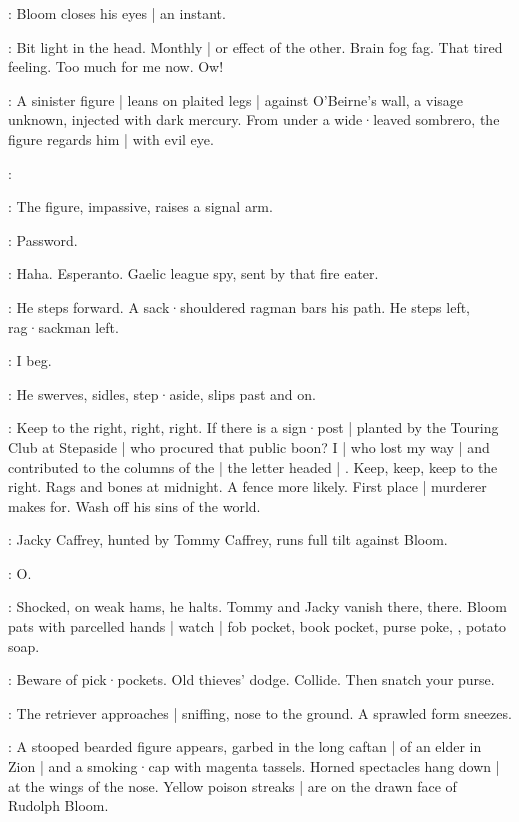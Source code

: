 :
Bloom closes his eyes |
an instant.

\Bloom:
Bit light in the head.
Monthly |
or effect of the other.
Brain fog fag.
That tired feeling.
Too much for me now.
Ow!

:
A sinister figure |
leans on plaited legs |
against O'Beirne's wall,
a visage unknown,
injected with dark mercury.
From under a wide·leaved sombrero,
the figure regards him |
with evil eye.

\Bloom:

:
The figure,
impassive,
raises a signal arm.

\Figure:
Password.

\Bloom:
Haha.
Esperanto.
Gaelic league spy,
sent by that fire eater.

:
He steps forward.
A sack·shouldered ragman bars his path.
He steps left,
rag·sackman left.

\Bloom:
I beg.

:
He swerves,
sidles,
step·aside,
slips past and on.

\Bloom:
Keep to the right,
right,
right.
If there is a sign·post |
planted by the Touring Club at Stepaside |
who procured that public boon?
I |
who lost my way |
and contributed to the columns of the  |
the letter headed |
.
Keep,
keep,
keep to the right.
Rags and bones at midnight.
A fence more likely.
First place |
murderer makes for.
Wash off his sins of the world.

:
Jacky Caffrey,
hunted by Tommy Caffrey,
runs full tilt against Bloom.

\Bloom:
O.

:
Shocked,
on weak hams,
he halts.
Tommy and Jacky vanish there,
there.
Bloom pats with parcelled hands |
watch |
fob pocket,
book pocket,
purse poke,
,
potato soap.

\Bloom:
Beware of pick·pockets.
Old thieves' dodge.
Collide.
Then snatch your purse.

:
The retriever approaches |
sniffing,
nose to the ground.
A sprawled form sneezes.

:
A stooped bearded figure appears,
garbed in the long caftan |
of an elder in Zion |
and a smoking·cap with magenta tassels.
Horned spectacles hang down |
at the wings of the nose.
Yellow poison streaks |
are on the drawn face of Rudolph Bloom.

